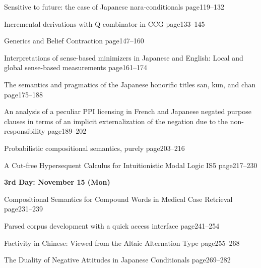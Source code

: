 \documentclass[12pt]{jarticle}
\begin{document}
  
     {Sensitive to future: the case of Japanese nara-conditionals}
     {page119--132}
  
     {Incremental derivations with Q combinator in CCG}
     {page133--145}
  
     {Generics and Belief Contraction}
     {page147--160}




  
     {Interpretations of sense-based minimizers in Japanese and English: Local and global sense-based measurements}
     {page161--174}
  
     {The semantics and pragmatics of the Japanese honorific titles san, kun, and chan}
     {page175--188}
  
     {An analysis of a peculiar PPI licensing in French and Japanese negated purpose clauses in terms of an implicit externalization of the negation due to the non-responsibility}
     {page189--202}




  
     {Probabilistic compositional semantics, purely}
     {page203--216}
  
  
     {A Cut-free Hypersequent Calculus for Intuitionistic Modal Logic IS5}
     {page217--230}




\noindent\textbf{\large 
3rd Day: November 15 (Mon)
}\\




  
     {Compositional Semantics for Compound Words in Medical Case Retrieval}
     {page231--239}
  
     {Parsed corpus development with a quick access interface}
     {page241--254}
  
     {Factivity in Chinese: Viewed from the Altaic Alternation Type}
     {page255--268}

  


  
     {The Duality of Negative Attitudes in Japanese Conditionals}
     {page269--282}
  
\end{document}
